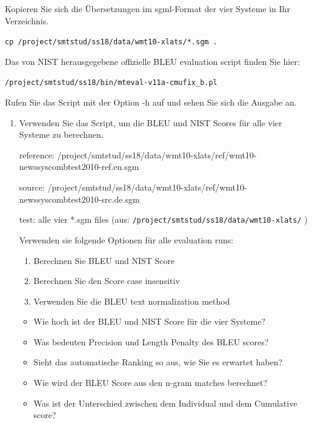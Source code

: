 \documentclass[12pt,fleqn]{article}
\begin{document}
\begin{enumerate}
\vspace{0.5cm} 
Kopieren Sie sich die Übersetzungen im sgml-Format der vier Systeme in Ihr Verzeichnis.

\texttt{cp /project/smtstud/ss18/data/wmt10-xlats/*.sgm .} 

\vspace{0.5cm} 
Das von NIST herausgegebene offizielle BLEU evaluation script finden Sie hier:

\texttt{/project/smtstud/ss18/bin/mteval-v11a-cmufix\_b.pl} 

\vspace{0.5cm} 
Rufen Sie das Script mit der Option -h auf und sehen Sie sich die Ausgabe an.

\vspace{0.5cm} 
\begin{enumerate} 
\item Verwenden Sie das Script, um die BLEU und NIST Scores für alle vier Systeme zu berechnen.

\vspace{0.5cm} 
reference: /project/smtstud/ss18/data/wmt10-xlats/ref/wmt10-newssyscombtest2010-ref.en.sgm

source:     
/project/smtstud/ss18/data/wmt10-xlats/ref/wmt10-newssyscombtest2010-src.de.sgm

test:            alle vier *.sgm files (aus: \texttt{/project/smtstud/ss18/data/wmt10-xlats/} )

\vspace{0.5cm} 
Verwenden sie folgende Optionen für alle evaluation runs:

\vspace{0.5cm} 
\begin{enumerate} 
\item Berechnen Sie BLEU und NIST Score
\item Berechnen Sie den Score case insensitiv
\item Verwenden Sie die BLEU text normalization method
\end{enumerate} 

\vspace{0.5cm} 
\begin{itemize} 
\item Wie hoch ist der BLEU und NIST Score für die vier Systeme?
\item Was bedeuten Precision und Length Penalty des BLEU scores?
\item Sieht das automatische Ranking so aus, wie Sie es erwartet haben?
\item Wie wird der BLEU Score aus den n-gram matches berechnet?
\item Was ist der Unterschied zwischen dem Individual und dem Cumulative score?
\end{itemize} 


\end{enumerate}
\end{enumerate}
\end{document}
